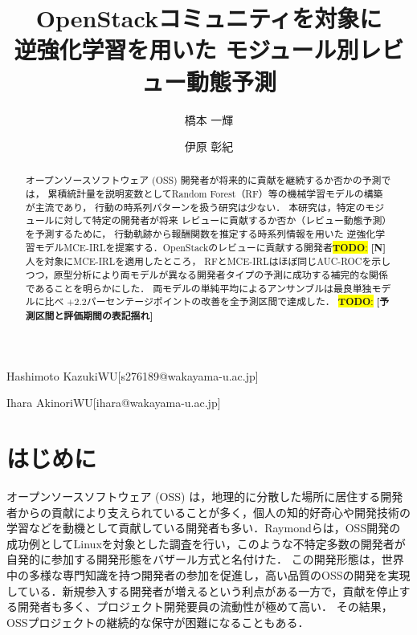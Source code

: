 \documentclass[submit,noauthor,ses,dvipdfmx]{ipsj}
\newcommand{\todo}[1]{\colorbox{yellow}{{\bf TODO}:}{\color{red} {\textbf{[#1]}}}}
\begin{document}
\raggedbottom


\title{OpenStackコミュニティを対象に\\逆強化学習を用いた
モジュール別レビュー動態予測}




\author{橋本  一輝}{Hashimoto Kazuki}{WU}[s276189@wakayama-u.ac.jp]
\author{伊原  彰紀}{Ihara Akinori}{WU}[ihara@wakayama-u.ac.jp]

\begin{abstract}
オープンソースソフトウェア (OSS) 開発者が将来的に貢献を継続するか否かの予測では， 累積統計量を説明変数としてRandom Forest（RF）等の機械学習モデルの構築が主流であり， 行動の時系列パターンを扱う研究は少ない． 本研究は，特定のモジュールに対して特定の開発者が将来 レビューに貢献するか否か（レビュー動態予測）を予測するために， 行動軌跡から報酬関数を推定する時系列情報を用いた 逆強化学習モデルMCE-IRLを提案する．OpenStackのレビューに貢献する開発者\todo{N}人を対象にMCE-IRLを適用したところ， RFとMCE-IRLはほぼ同じAUC-ROCを示しつつ，原型分析により両モデルが異なる開発者タイプの予測に成功する補完的な関係であることを明らかにした． 両モデルの単純平均によるアンサンブルは最良単独モデルに比べ $+2.2$パーセンテージポイントの改善を全予測区間で達成した．
\todo{予測区間と評価期間の表記揺れ}
\end{abstract}

\maketitle
\section{はじめに}\label{sec:Introduction}
オープンソースソフトウェア (OSS) は，地理的に分散した場所に居住する開発者からの貢献により支えられていることが多く，個人の知的好奇心や開発技術の学習などを動機として貢献している開発者も多い\cite{motivation}．Raymondらは，OSS開発の成功例としてLinuxを対象とした調査を行い，このような不特定多数の開発者が自発的に参加する開発形態をバザール方式と名付けた\cite{bazzar}．
この開発形態は，世界中の多様な専門知識を持つ開発者の参加を促進し，高い品質のOSSの開発を実現している．新規参入する開発者が増えるという利点がある一方で，貢献を停止する開発者も多く、プロジェクト開発要員の流動性が極めて高い\cite{dynamics}．%
その結果，OSSプロジェクトの継続的な保守が困難になることもある\cite{pinto_otc}．
\end{document}

